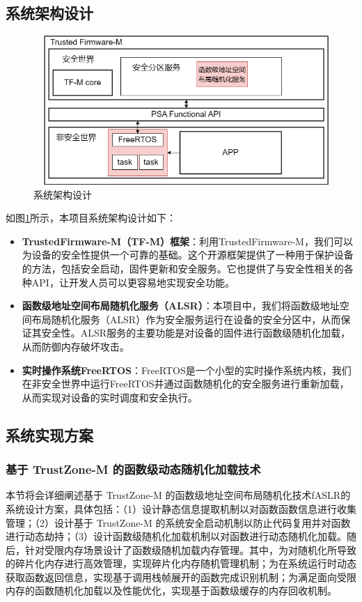 \documentclass[12pt,a4paper]{ctexart}
\numberwithin{figure}{section}
\begin{document}
\subsection{系统架构设计}
\begin{figure}[H]
    \centering
    \includegraphics[scale=0.5]{graph/picture of all works.png}
    \caption{系统架构设计}
    \label{fig:system_architecture}
\end{figure}
\par 如图\ref{fig:system_architecture}所示，本项目系统架构设计如下：

\begin{itemize}
    \item \textbf{TrustedFirmware-M（TF-M）框架}：利用TrustedFirmware-M，我们可以为设备的安全性提供一个可靠的基础。这个开源框架提供了一种用于保护设备的方法，包括安全启动，固件更新和安全服务。它也提供了与安全性相关的各种API，让开发人员可以更容易地实现安全功能。
    \item \textbf{函数级地址空间布局随机化服务（ALSR）}：本项目中，我们将函数级地址空间布局随机化服务（ALSR）作为安全服务运行在设备的安全分区中，从而保证其安全性。ALSR服务的主要功能是对设备的固件进行函数级随机化加载，从而防御内存破坏攻击。
    \item \textbf{实时操作系统FreeRTOS}：FreeRTOS是一个小型的实时操作系统内核，我们在非安全世界中运行FreeRTOS并通过函数随机化的安全服务进行重新加载，从而实现对设备的实时调度和安全执行。
\end{itemize}

\subsection{系统实现方案}

\subsubsection{基于 TrustZone-M 的函数级动态随机化加载技术}
\par 本节将会详细阐述基于 TrustZone-M 的函数级地址空间布局随机化技术fASLR的系统设计方案，具体包括：（1）设计静态信息提取机制以对函数函数信息进行收集管理；（2）设计基于 TrustZone-M 的系统安全启动机制以防止代码复用并对函数进行动态劫持；（3）设计函数级随机化加载机制以对函数进行动态随机化加载。随后，针对受限内存场景设计了函数级随机加载内存管理。其中，为对随机化所导致的碎片化内存进行高效管理，实现碎片化内存随机管理机制；为在系统运行时动态获取函数返回信息，实现基于调用栈帧展开的函数完成识别机制；为满足面向受限内存的函数随机化加载以及性能优化，实现基于函数级缓存的内存回收机制。
\end{document}
